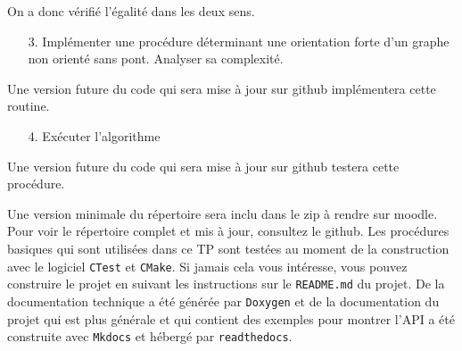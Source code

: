 \documentclass[10pt]{article} %
\begin{document}
On a donc vérifié l'égalité dans les deux sens.

\begin{itemize}
    \item [3.] Implémenter une procédure déterminant une orientation forte d'un graphe non orienté sans pont. Analyser sa complexité.
\end{itemize}

    Une version future du code qui sera mise à jour sur github implémentera cette routine.

\begin{itemize}
    \item[4.] Exécuter l'algorithme
\end{itemize}

    Une version future du code qui sera mise à jour sur github testera cette procédure.

\vspace{.5cm}
\noindent {} 

Une version minimale du répertoire sera inclu dans le zip à rendre sur moodle. Pour voir le répertoire complet et mis à jour, consultez le
github. Les procédures basiques qui sont utilisées dans ce TP sont testées au moment de la construction avec le logiciel \texttt{CTest} et \texttt{CMake}. Si jamais cela vous intéresse,
vous pouvez construire le projet en suivant les instructions sur le \texttt{README.md} du projet. De la documentation technique a été générée par \texttt{Doxygen} et de la
documentation du projet qui est plus générale et qui contient des exemples pour montrer l'API a été construite avec \texttt{Mkdocs} et hébergé par \texttt{readthedocs}.


\end{document}
